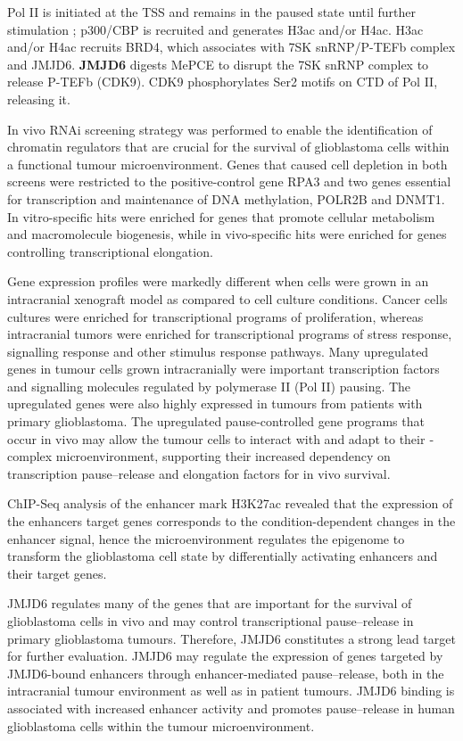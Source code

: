  
Pol II is initiated at the TSS and remains in the paused state until further stimulation ; p300/CBP is recruited and generates H3ac and/or H4ac. H3ac and/or H4ac recruits BRD4, which associates with 7SK snRNP/P-TEFb complex and JMJD6. \textbf{JMJD6} digests MePCE to disrupt the 7SK snRNP complex to release P-TEFb (CDK9). CDK9 phosphorylates Ser2 motifs on CTD of Pol II,  releasing it.

In vivo RNAi screening strategy was performed to enable the identification of chromatin regulators that are crucial for the survival of glioblastoma cells within a functional tumour microenvironment. Genes that caused cell depletion in both screens were restricted to the positive-control gene RPA3 and two genes essential for transcription and maintenance of DNA methylation, POLR2B and DNMT1. In vitro-specific hits were enriched for genes that promote cellular metabolism and macromolecule biogenesis, while in vivo-specific hits were enriched for genes controlling transcriptional elongation.

Gene expression profiles were markedly different when cells were grown in an intracranial xenograft model as compared to cell culture conditions. Cancer cells cultures were enriched for transcriptional programs of proliferation, whereas intracranial tumors were enriched for transcriptional programs of stress response, signalling response and other stimulus response pathways. Many upregulated genes in tumour cells grown intracranially were important transcription factors and signalling molecules regulated by polymerase II (Pol II) pausing. The upregulated genes were also highly expressed in tumours from patients with primary glioblastoma. The upregulated pause-controlled gene programs that occur in vivo may allow the tumour cells to interact with and adapt to their ­complex microenvironment, supporting their increased dependency on transcription pause–release and elongation factors for in vivo survival.

ChIP-Seq analysis of the enhancer mark H3K27ac revealed that the expression of the enhancers target genes corresponds to the condition-dependent changes in the enhancer signal, hence the microenvironment regulates the epigenome to transform the glioblastoma cell state by differentially activating enhancers and their target genes.

JMJD6 regulates many of the genes that are important for the survival of glioblastoma cells in vivo and may control transcriptional pause–release in primary glioblastoma tumours. Therefore, JMJD6 constitutes a strong lead target for further evaluation. JMJD6 may regulate the expression of genes targeted by JMJD6-bound enhancers through enhancer-mediated pause–release, both in the intracranial tumour environment as well as in patient tumours. JMJD6 binding is associated with increased enhancer activity and promotes pause–release in human glioblastoma cells within the tumour microenvironment.

